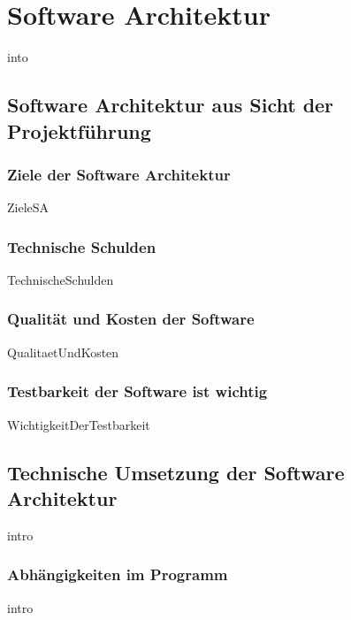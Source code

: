 \documentclass{article}
\begin{document}
\newpage

\section{Software Architektur}
    {into}

    \subsection{Software Architektur aus Sicht der Projektführung}

        \subsubsection{Ziele der Software Architektur}
            {ZieleSA}
        \subsubsection{Technische Schulden}
            {TechnischeSchulden}

    \newpage
        \subsubsection{Qualität und Kosten der Software}
        \nocite{MF_isHighQuilatySoftwareWorthTheCost}
            {QualitaetUndKosten}
        
        \subsubsection{Testbarkeit der Software ist wichtig}
            {WichtigkeitDerTestbarkeit}
   
    \newpage
    \subsection{Technische Umsetzung der Software Architektur}
        {intro}

        \newpage
        \subsubsection{Abhängigkeiten im Programm}
        \label{kap:Structur}
            {intro}
            \label{kap:StrukturIntro}
\end{document}
